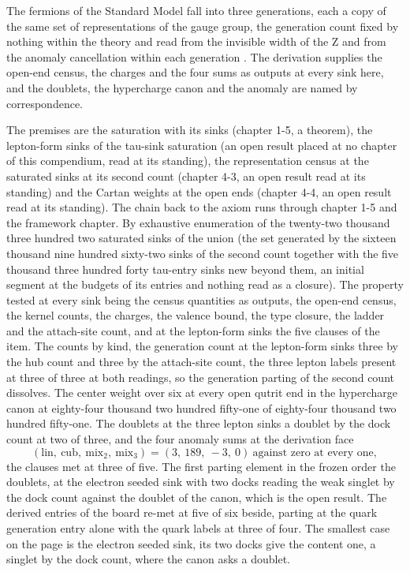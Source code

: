 \begin{chbridge}
The fermions of the Standard Model fall into three generations, each a copy of the same set of representations of the gauge group, the generation count fixed by nothing within the theory and read from the invisible width of the Z and from the anomaly cancellation within each generation \cite{Glashow1961,Weinberg1967,Bouchiat1972}. The derivation supplies the open-end census, the charges and the four sums as outputs at every sink here, and the doublets, the hypercharge canon and the anomaly are named by correspondence.
\end{chbridge}
\begin{chproof}[census]
The premises are the saturation with its sinks (chapter 1-5, a theorem), the lepton-form sinks of the tau-sink saturation (an open result placed at no chapter of this compendium, read at its standing), the representation census at the saturated sinks at its second count (chapter 4-3, an open result read at its standing) and the Cartan weights at the open ends (chapter 4-4, an open result read at its standing). The chain back to the axiom runs through chapter 1-5 and the framework chapter. By exhaustive enumeration of the twenty-two thousand three hundred two saturated sinks of the union (the set generated by the sixteen thousand nine hundred sixty-two sinks of the second count together with the five thousand three hundred forty tau-entry sinks new beyond them, an initial segment at the budgets of its entries and nothing read as a closure). The property tested at every sink being the census quantities as outputs, the open-end census, the kernel counts, the charges, the valence bound, the type closure, the ladder and the attach-site count, and at the lepton-form sinks the five clauses of the item. The counts by kind, the generation count at the lepton-form sinks three by the hub count and three by the attach-site count, the three lepton labels present at three of three at both readings, so the generation parting of the second count dissolves. The center weight over six at every open qutrit end in the hypercharge canon at eighty-four thousand two hundred fifty-one of eighty-four thousand two hundred fifty-one. The doublets at the three lepton sinks a doublet by the dock count at two of three, and the four anomaly sums at the derivation face
\begin{equation}
(\text{lin},\ \text{cub},\ \text{mix}_{2},\ \text{mix}_{3}) = (3,\ 189,\ -3,\ 0) \ \text{against zero at every one} ,
\end{equation}
the clauses met at three of five. The first parting element in the frozen order the doublets, at the electron seeded sink with two docks reading the weak singlet by the dock count against the doublet of the canon, which is the open result. The derived entries of the board re-met at five of six beside, parting at the quark generation entry alone with the quark labels at three of four. The smallest case on the page is the electron seeded sink, its two docks give the content one, a singlet by the dock count, where the canon asks a doublet.


\end{chproof}

